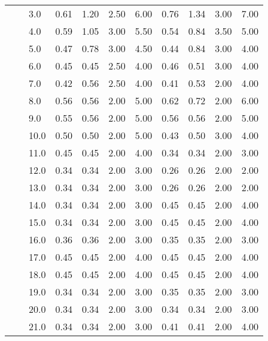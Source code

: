 \begin{tabular}{lllrrrrrrrr}
   &     & 3.0  &       0.61 &      1.20 & 2.50 &   6.00 &       0.76 &      1.34 & 3.00 &   7.00 \\
   &     & 4.0  &       0.59 &      1.05 & 3.00 &   5.50 &       0.54 &      0.84 & 3.50 &   5.00 \\
   &     & 5.0  &       0.47 &      0.78 & 3.00 &   4.50 &       0.44 &      0.84 & 3.00 &   4.00 \\
   &     & 6.0  &       0.45 &      0.45 & 2.50 &   4.00 &       0.46 &      0.51 & 3.00 &   4.00 \\
   &     & 7.0  &       0.42 &      0.56 & 2.50 &   4.00 &       0.41 &      0.53 & 2.00 &   4.00 \\
   &     & 8.0  &       0.56 &      0.56 & 2.00 &   5.00 &       0.62 &      0.72 & 2.00 &   6.00 \\
   &     & 9.0  &       0.55 &      0.56 & 2.00 &   5.00 &       0.56 &      0.56 & 2.00 &   5.00 \\
   &     & 10.0 &       0.50 &      0.50 & 2.00 &   5.00 &       0.43 &      0.50 & 3.00 &   4.00 \\
   &     & 11.0 &       0.45 &      0.45 & 2.00 &   4.00 &       0.34 &      0.34 & 2.00 &   3.00 \\
   &     & 12.0 &       0.34 &      0.34 & 2.00 &   3.00 &       0.26 &      0.26 & 2.00 &   2.00 \\
   &     & 13.0 &       0.34 &      0.34 & 2.00 &   3.00 &       0.26 &      0.26 & 2.00 &   2.00 \\
   &     & 14.0 &       0.34 &      0.34 & 2.00 &   3.00 &       0.45 &      0.45 & 2.00 &   4.00 \\
   &     & 15.0 &       0.34 &      0.34 & 2.00 &   3.00 &       0.45 &      0.45 & 2.00 &   4.00 \\
   &     & 16.0 &       0.36 &      0.36 & 2.00 &   3.00 &       0.35 &      0.35 & 2.00 &   3.00 \\
   &     & 17.0 &       0.45 &      0.45 & 2.00 &   4.00 &       0.45 &      0.45 & 2.00 &   4.00 \\
   &     & 18.0 &       0.45 &      0.45 & 2.00 &   4.00 &       0.45 &      0.45 & 2.00 &   4.00 \\
   &     & 19.0 &       0.34 &      0.34 & 2.00 &   3.00 &       0.35 &      0.35 & 2.00 &   3.00 \\
   &     & 20.0 &       0.34 &      0.34 & 2.00 &   3.00 &       0.34 &      0.34 & 2.00 &   3.00 \\
   &     & 21.0 &       0.34 &      0.34 & 2.00 &   3.00 &       0.41 &      0.41 & 2.00 &   4.00 \\

\end{tabular}
